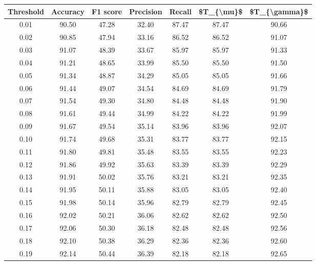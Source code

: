 \begin{tabular}{|c|c|c|c|c|c|c|}
\hline
 Threshold &  Accuracy &  F1 score &  Precision &  Recall &  \$T\_\{\textbackslash mu\}\$ &  \$T\_\{\textbackslash gamma\}\$ \\
\hline
      0.01 &     90.50 &     47.28 &      32.40 &   87.47 &      87.47 &         90.66 \\
      0.02 &     90.85 &     47.94 &      33.16 &   86.52 &      86.52 &         91.07 \\
      0.03 &     91.07 &     48.39 &      33.67 &   85.97 &      85.97 &         91.33 \\
      0.04 &     91.21 &     48.65 &      33.99 &   85.50 &      85.50 &         91.50 \\
      0.05 &     91.34 &     48.87 &      34.29 &   85.05 &      85.05 &         91.66 \\
      0.06 &     91.44 &     49.07 &      34.54 &   84.69 &      84.69 &         91.79 \\
      0.07 &     91.54 &     49.30 &      34.80 &   84.48 &      84.48 &         91.90 \\
      0.08 &     91.61 &     49.44 &      34.99 &   84.22 &      84.22 &         91.99 \\
      0.09 &     91.67 &     49.54 &      35.14 &   83.96 &      83.96 &         92.07 \\
      0.10 &     91.74 &     49.68 &      35.31 &   83.77 &      83.77 &         92.15 \\
      0.11 &     91.80 &     49.81 &      35.48 &   83.55 &      83.55 &         92.23 \\
      0.12 &     91.86 &     49.92 &      35.63 &   83.39 &      83.39 &         92.29 \\
      0.13 &     91.91 &     50.02 &      35.76 &   83.21 &      83.21 &         92.35 \\
      0.14 &     91.95 &     50.11 &      35.88 &   83.05 &      83.05 &         92.40 \\
      0.15 &     91.98 &     50.14 &      35.96 &   82.79 &      82.79 &         92.45 \\
      0.16 &     92.02 &     50.21 &      36.06 &   82.62 &      82.62 &         92.50 \\
      0.17 &     92.06 &     50.30 &      36.18 &   82.48 &      82.48 &         92.56 \\
      0.18 &     92.10 &     50.38 &      36.29 &   82.36 &      82.36 &         92.60 \\
      0.19 &     92.14 &     50.44 &      36.39 &   82.18 &      82.18 &         92.65 \\

\end{tabular}
